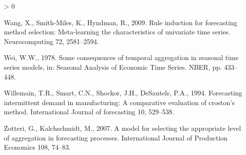 \documentclass[]{elsarticle} %
\newlength{\cslhangindent}
\newenvironment{CSLReferences}[2] %
 {%
  \setlength{\parindent}{0pt}
  \ifodd #1 \everypar{\setlength{\hangindent}{\cslhangindent}}\ignorespaces\fi
  \ifnum #2 > 0
  \setlength{\parskip}{#2\baselineskip}
  \fi
 }%
 {}
\begin{document}
\begin{CSLReferences}{1}{0}
\leavevmode\hypertarget{ref-wang2009rule}{}%
Wang, X., Smith-Miles, K., Hyndman, R., 2009. Rule induction for
forecasting method selection: Meta-learning the characteristics of
univariate time series. Neurocomputing 72, 2581--2594.

\leavevmode\hypertarget{ref-wei1978some}{}%
Wei, W.W., 1978. Some consequences of temporal aggregation in seasonal
time series models, in: Seasonal Analysis of Economic Time Series. NBER,
pp. 433--448.

\leavevmode\hypertarget{ref-willemain1994forecasting}{}%
Willemain, T.R., Smart, C.N., Shockor, J.H., DeSautels, P.A., 1994.
Forecasting intermittent demand in manufacturing: A comparative
evaluation of croston's method. International Journal of forecasting 10,
529--538.

\leavevmode\hypertarget{ref-zotteri2007model}{}%
Zotteri, G., Kalchschmidt, M., 2007. A model for selecting the
appropriate level of aggregation in forecasting processes. International
Journal of Production Economics 108, 74--83.

\end{CSLReferences}
\end{document}
